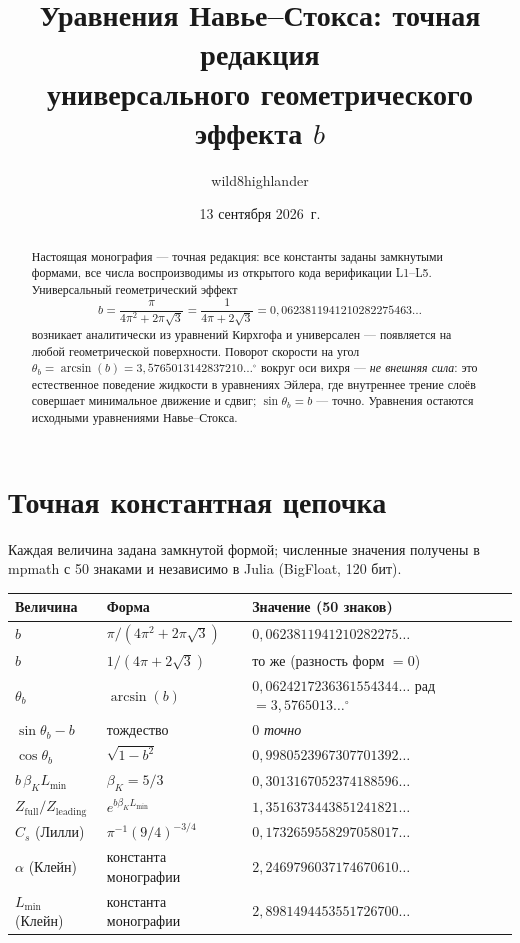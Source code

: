 \documentclass[12pt]{article}
\title{\textbf{Уравнения Навье--Стокса: точная редакция\\ универсального геометрического эффекта $b$}}
\author{wild8highlander}
\date{13 сентября 2026~г.}
\begin{document}
\maketitle

\begin{abstract}
Настоящая монография --- точная редакция: все константы заданы замкнутыми формами,
все числа воспроизводимы из открытого кода верификации L1--L5. Универсальный
геометрический эффект
\[
b=\frac{\pi}{4\pi^{2}+2\pi\sqrt3}=\frac{1}{4\pi+2\sqrt3}=0{,}0623811941210282275463\ldots
\]
возникает аналитически из уравнений Кирхгофа и универсален --- появляется на любой
геометрической поверхности. Поворот скорости на угол
$\theta_b=\arcsin(b)=3{,}5765013142837210\ldots^\circ$ вокруг оси вихря --- \emph{не
внешняя сила}: это естественное поведение жидкости в уравнениях Эйлера, где внутреннее
трение слоёв совершает минимальное движение и сдвиг; $\sin\theta_b=b$ --- точно.
Уравнения остаются исходными уравнениями Навье--Стокса.
\end{abstract}

\section{Точная константная цепочка}

Каждая величина задана замкнутой формой; численные значения получены в mpmath
с 50 знаками и независимо в Julia (BigFloat, 120 бит).

\begin{table}[h]
\centering
\begin{tabular}{lll}
\toprule
Величина & Форма & Значение (50 знаков) \\
\midrule
$b$ & $\pi/(4\pi^{2}+2\pi\sqrt3)$ & $0{,}0623811941210282275\ldots$ \\
$b$ & $1/(4\pi+2\sqrt3)$ & то же (разность форм $=0$) \\
$\theta_b$ & $\arcsin(b)$ & $0{,}0624217236361554344\ldots$ рад $=3{,}5765013\ldots^\circ$ \\
$\sin\theta_b-b$ & тождество & $0$ \emph{точно} \\
$\cos\theta_b$ & $\sqrt{1-b^{2}}$ & $0{,}9980523967307701392\ldots$ \\
$b\,\beta_K L_{\min}$ & $\beta_K=5/3$ & $0{,}3013167052374188596\ldots$ \\
$Z_{\mathrm{full}}/Z_{\mathrm{leading}}$ & $e^{b\beta_K L_{\min}}$ & $1{,}3516373443851241821\ldots$ \\
$C_s$ (Лилли) & $\pi^{-1}(9/4)^{-3/4}$ & $0{,}1732659558297058017\ldots$ \\
$\alpha$ (Клейн) & константа монографии & $2{,}2469796037174670610\ldots$ \\
$L_{\min}$ (Клейн) & константа монографии & $2{,}8981494453551726700\ldots$ \\
\bottomrule
\end{tabular}
\end{table}
\end{document}

